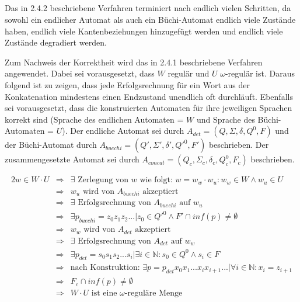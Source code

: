 \documentclass[10pt,a4paper,oneside,ngerman,numbers=noenddot]{scrartcl}
\begin{document}
	\subsection{} %
		Das in 2.4.2 beschriebene Verfahren terminiert nach endlich vielen Schritten, da sowohl ein endlicher Automat als auch ein Büchi-Automat endlich viele Zustände haben, endlich viele Kantenbeziehungen hinzugefügt werden und endlich viele Zustände degradiert werden.
		
		Zum Nachweis der Korrektheit wird das in 2.4.1 beschriebene Verfahren angewendet. Dabei sei vorausgesetzt, dass \(W\) regulär und \(U\) \(\omega\)-regulär ist. Daraus folgend ist zu zeigen, dass jede Erfolgsrechnung für ein Wort aus der Konkatenation mindestens einen Endzustand unendlich oft durchläuft. Ebenfalls sei vorausgesetzt, dass die konstruierten Automaten für ihre jeweiligen Sprachen korrekt sind (Sprache des endlichen Automaten = \(W\) und Sprache des Büchi-Automaten = \(U\)). Der endliche Automat sei durch \(A_{det} = (Q, \Sigma, \delta, Q^{0}, F)\) und der Büchi-Automat durch \(A_{buechi} = (Q', \Sigma ', \delta ', Q'^{0}, F')\) beschrieben. Der zusammengesetzte Automat sei durch \(A_{concat} = (Q_{c}, \Sigma_{c}, \delta_{c}, Q_{c}^{0}, F_{c})\) beschrieben.
		
		\begin{alignat*}{2}
			w \in W \cdot U &\Rightarrow & \exists \text{ Zerlegung von \(w\) wie folgt: }w = w_{w} \cdot w_{u} : w_{w} \in W \wedge w_{u} \in U \\
							&\Rightarrow & w_{u} \text{ wird von \(A_{buechi}\) akzeptiert} \\
							&\Rightarrow & \exists \text{ Erfolgsrechnung von \(A_{buechi}\) auf \(w_{u}\)} \\
							&\Rightarrow & \exists p_{buechi} = z_{0}z_{1}z_{2}... | z_{0} \in Q'^{0} \wedge F' \cap inf(p) \neq \emptyset \\
							&\Rightarrow & w_{w} \text{ wird von \(A_{det}\) akzeptiert} \\
							&\Rightarrow & \exists \text{ Erfolgsrechnung von \(A_{det}\) auf \(w_{w}\)} \\
							&\Rightarrow & \exists p_{det} = s_{0}s_{1}s_{2}...s_{i} | \exists i \in \mathbb{N} : s_{0} \in Q^{0} \wedge s_{i} \in F \\
							&\Rightarrow & \text{nach Konstruktion: } \exists p = p_{det}x_{0}x_{1}...x_{i}x_{i+1}... | \forall i \in \mathbb{N} : x_{i} = z_{i+1}  \\
							&\Rightarrow & F_{c} \cap inf(p) \neq \emptyset \\
							&\Rightarrow & W \cdot U \text{ ist eine \(\omega\)-reguläre Menge}
		\end{alignat*}
\end{document}

